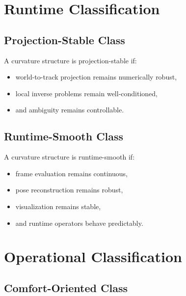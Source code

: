 \section{Runtime Classification}

\subsection{Projection-Stable Class}

\begin{definition}
\label{def:projection-stable-class}
A curvature structure is projection-stable if:
\begin{itemize}
\item world-to-track projection remains numerically robust,
\item local inverse problems remain well-conditioned,
\item and ambiguity remains controllable.
\end{itemize}
\end{definition}


\subsection{Runtime-Smooth Class}

\begin{definition}
\label{def:runtime-smooth-class}
A curvature structure is runtime-smooth if:
\begin{itemize}
\item frame evaluation remains continuous,
\item pose reconstruction remains robust,
\item visualization remains stable,
\item and runtime operators behave predictably.
\end{itemize}
\end{definition}

\section{Operational Classification}

\subsection{Comfort-Oriented Class}

